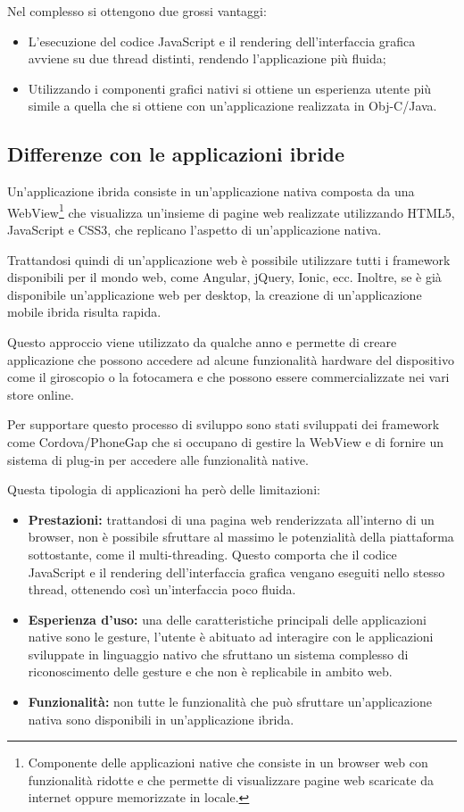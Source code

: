Nel complesso si ottengono due grossi vantaggi:
\begin{itemize}
\item L'esecuzione del codice JavaScript e il rendering dell'interfaccia grafica avviene su due thread distinti, rendendo l'applicazione più fluida;
\item Utilizzando i componenti grafici nativi si ottiene un esperienza utente più simile a quella che si ottiene con un'applicazione realizzata in Obj-C/Java.
\end{itemize}

\subsection{Differenze con le applicazioni ibride}

Un'applicazione ibrida consiste in un'applicazione nativa composta da una WebView\footnote{Componente delle applicazioni native che consiste in un browser web con funzionalità ridotte e che permette di visualizzare pagine web scaricate da internet oppure memorizzate in locale.} che visualizza un'insieme di pagine web realizzate utilizzando HTML5, JavaScript e CSS3, che replicano l'aspetto di un'applicazione nativa.

Trattandosi quindi di un'applicazione web è possibile utilizzare tutti i framework disponibili per il mondo web, come Angular, jQuery, Ionic, ecc.
Inoltre, se è già disponibile un'applicazione web per desktop, la creazione di un'applicazione mobile ibrida risulta rapida.

Questo approccio viene utilizzato da qualche anno e permette di creare applicazione che possono accedere ad alcune funzionalità hardware del dispositivo come il giroscopio o la fotocamera e che possono essere commercializzate nei vari store online.

Per supportare questo processo di sviluppo sono stati sviluppati dei framework come Cordova/PhoneGap che si occupano di gestire la WebView e di fornire un sistema di plug-in per accedere alle funzionalità native.

Questa tipologia di applicazioni ha però delle limitazioni:
\begin{itemize}
\item \textbf{Prestazioni:} trattandosi di una pagina web renderizzata all'interno di un browser, non è possibile sfruttare al massimo le potenzialità della piattaforma sottostante, come il multi-threading. Questo comporta che il codice JavaScript e il rendering dell'interfaccia grafica vengano eseguiti nello stesso thread, ottenendo così un'interfaccia poco fluida.
\item \textbf{Esperienza d'uso:} una delle caratteristiche principali delle applicazioni native sono le gesture, l'utente è abituato ad interagire con le applicazioni sviluppate in linguaggio nativo che sfruttano un sistema complesso di riconoscimento delle gesture e che non è replicabile in ambito web. 
\item \textbf{Funzionalità:} non tutte le funzionalità che può sfruttare un'applicazione nativa sono disponibili in un'applicazione ibrida.
\end{itemize}

